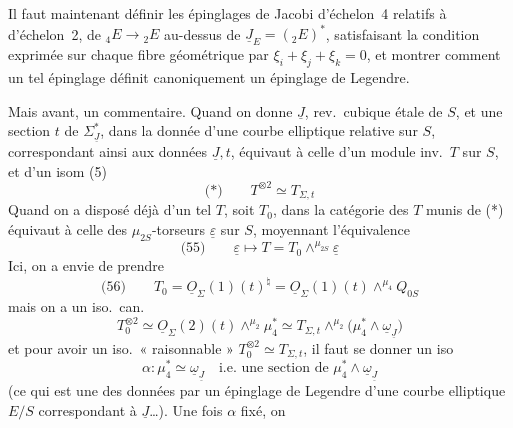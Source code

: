 \documentclass[11pt,a4paper]{article}
\begin{document}

Il faut maintenant définir les épinglages de Jacobi d'échelon~4 relatifs
à  d'échelon~2,   de ${}_4E \to {}_2E$ au-dessus de
$\underline{J}_E = ({}_2E)^{*}$, satisfaisant la condition exprimée
\struck{\ill{}} sur chaque fibre géométrique par
$\xi_i + \xi_j + \xi_k = 0$, et montrer comment un tel épinglage définit
canoniquement un épinglage de Legendre.

Mais avant, un commentaire. Quand on donne $\underline{J}$, rev.\ cubique
étale de $S$, et une section $t$ de $\Sigma_{\underline{J}}^{*}$, dans la
donnée d'une courbe elliptique relative sur $S$, correspondant ainsi aux
données $\underline{J}, t$, équivaut à celle d'un module inv.\ $T$ sur $S$,
et d'un isom (5)
\[
  \text{(*)} \qquad T^{\otimes 2} \simeq T_{\Sigma,t}
\]
Quand on a disposé déjà d'un tel $T$, soit $T_0$, dans la catégorie des $T$
 munis de (*) équivaut à celle des $\mu_{2S}$-torseurs
$\underline{\varepsilon}$ sur $S$, moyennant l'équivalence
\[
  \text{(55)} \qquad \underline{\varepsilon} \longmapsto T = T_0 \wedge^{\mu_{2S}} \underline{\varepsilon}
\]
Ici, on a envie de prendre
\[
  \text{(56)} \qquad T_0 = \underline{O}_{\Sigma}(1)(t)^{\natural}
  = \underline{O}_{\Sigma}(1)(t) \wedge^{\mu_4} Q_{0S}
\]
mais on a un iso.\ can.
\[
  T_0^{\otimes 2} \simeq \underline{O}_{\Sigma}(2)(t) \wedge^{\mu_2} \mu_4^{*}
  \simeq T_{\Sigma,t} \wedge^{\mu_2} \bigl(\mu_4^{*} \wedge \underline{\omega}_{\underline{J}}\bigr)
\]
et pour avoir un iso.\ « raisonnable » $T_0^{\otimes 2} \simeq T_{\Sigma,t}$,
il faut se donner un  iso
\[
  \alpha : \mu_4^{*} \simeq \underline{\omega}_{\underline{J}}
  \quad \text{i.e.\ une section de } \mu_4^{*} \wedge \underline{\omega}_{\underline{J}}
\]
(ce qui est une des données  par un épinglage de Legendre
d'une courbe elliptique $E/S$ correspondant à $\underline{J}$\ldots). Une fois
$\alpha$ fixé, on
\end{document}
